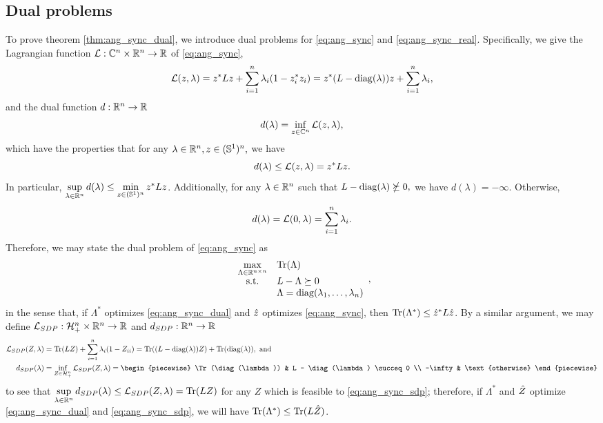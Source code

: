 \subsection{Dual problems}
To prove theorem \ref{thm:ang_sync_dual}, we introduce dual problems for \eqref{eq:ang_sync} and \eqref{eq:ang_sync_real}.  Specifically, we give the Lagrangian function $\mathcal{L} : \mathbb{C}^n \times \mathbb{R}^n \to \mathbb{R}$ of \eqref{eq:ang_sync}, \[\mathcal{L}(z, \lambda) = z^* L z + \sum_{i = 1}^n \lambda_i (1 - z_i^* z_i) = z^*(L - \operatorname{diag}(\lambda)) z + \sum_{i = 1}^n \lambda_i,\] and the dual function $d : \mathbb{R}^n \to \mathbb{R}$ \[d(\lambda) = \inf_{z \in \mathbb{C}^n} \mathcal{L}(z, \lambda),\] which have the properties that for any $\lambda \in \mathbb{R}^n, z \in (\mathbb{S}^1)^n,$ we have \[d(\lambda) \le \mathcal{L}(z, \lambda) = z^* L z.\]  In particular, $\sup\limits_{\lambda \in \mathbb{R}^n} d(\lambda) \le \min\limits_{z \in (\mathbb{S}^1)^n} z^* L z$.  Additionally, for any $\lambda \in \mathbb{R}^n$ such that $L - \operatorname{diag}(\lambda) \nsucceq 0,$ we have $d(\lambda) = - \infty$.  Otherwise, \[d(\lambda) = \mathcal{L}(0, \lambda) = \sum_{i = 1}^n \lambda_i.\]  Therefore, we may state the dual problem of \eqref{eq:ang_sync} as
\begin{equation}
  \begin{array}{cl} \max\limits_{\Lambda \in \mathbb{R}^{n \times n}} & \operatorname{Tr}(\Lambda) \\
    \text{s.t.} & L - \Lambda \succeq 0 \\
    & \Lambda = \operatorname{diag}(\lambda_1, \ldots, \lambda_n)
  \end{array}, \label{eq:ang_sync_dual}
\end{equation}
in the sense that, if $\Lambda^*$ optimizes \eqref{eq:ang_sync_dual} and $\hat{z}$ optimizes \eqref{eq:ang_sync}, then $\operatorname{Tr}(\Lambda^*) \le \hat{z}^* L \hat{z}$.  By a similar argument, we may define $\mathcal{L}_{SDP} : \mathcal{H}_+^n \times \mathbb{R}^n \to \mathbb{R}$ and $d_{SDP} : \mathbb{R}^n \to \mathbb{R}$
\begin{align*}
  \Lc_{SDP}(Z, \lambda) &= \Tr(LZ) + \sum_{i = 1}^n \lambda_i(1 - Z_{ii}) = \Tr((L - \diag(\lambda)) Z) + \Tr(\diag(\lambda)), \ \text{and} \\
  d_{SDP}(\lambda) &= \inf_{Z \in \H^n_+} \Lc_{SDP}(Z, \lambda) = \begin{piecewise} \Tr(\diag(\lambda)) & L - \diag(\lambda) \succeq 0 \\ -\infty & \text{otherwise} \end{piecewise}
\end{align*}
to see that $\sup\limits_{\lambda \in \mathbb{R}^n} d_{SDP}(\lambda) \le \mathcal{L}_{SDP}(Z, \lambda) = \operatorname{Tr}(LZ)$ for any $Z$ which is feasible to \eqref{eq:ang_sync_sdp}; therefore, if $\Lambda^*$ and $\hat{Z}$ optimize \eqref{eq:ang_sync_dual} and \eqref{eq:ang_sync_sdp}, we will have $\operatorname{Tr}(\Lambda^*) \le \operatorname{Tr}(L\hat{Z})$.

